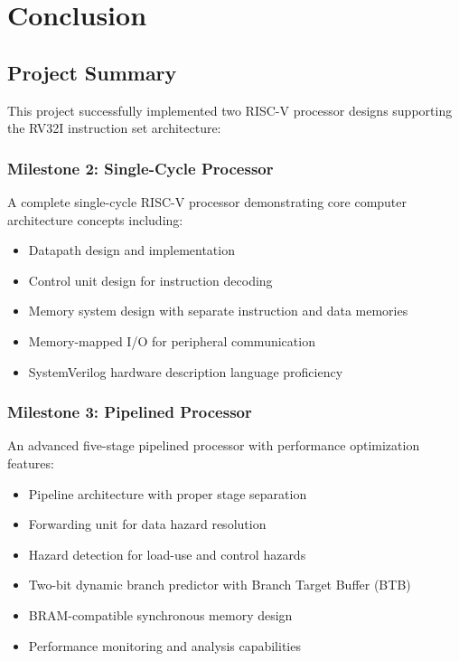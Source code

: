 \chapter{Conclusion}

\section{Project Summary}

This project successfully implemented two RISC-V processor designs supporting the RV32I instruction set architecture:

\subsection{Milestone 2: Single-Cycle Processor}

A complete single-cycle RISC-V processor demonstrating core computer architecture concepts including:

\begin{itemize}
    \item Datapath design and implementation
    \item Control unit design for instruction decoding
    \item Memory system design with separate instruction and data memories
    \item Memory-mapped I/O for peripheral communication
    \item SystemVerilog hardware description language proficiency
\end{itemize}

\subsection{Milestone 3: Pipelined Processor}

An advanced five-stage pipelined processor with performance optimization features:

\begin{itemize}
    \item Pipeline architecture with proper stage separation
    \item Forwarding unit for data hazard resolution
    \item Hazard detection for load-use and control hazards
    \item Two-bit dynamic branch predictor with Branch Target Buffer (BTB)
    \item BRAM-compatible synchronous memory design
    \item Performance monitoring and analysis capabilities
\end{itemize}

